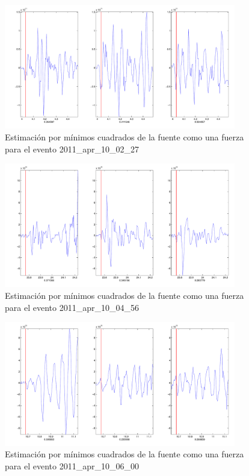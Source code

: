\begin{figure}[H]
\includegraphics[width=0.9\textwidth,height=0.4\textheight]{linea_timerev/figuras/plotSrcEv25src.pdf}
\caption{Estimación por mínimos cuadrados de la fuente como una fuerza para el
evento 2011\_apr\_10\_02\_27}
\end{figure}
\begin{figure}[H]
\includegraphics[width=0.9\textwidth,height=0.4\textheight]{linea_timerev/figuras/plotSrcEv26src.pdf}
\caption{Estimación por mínimos cuadrados de la fuente como una fuerza para el
evento 2011\_apr\_10\_04\_56}
\end{figure}
\begin{figure}[H]
\includegraphics[width=0.9\textwidth,height=0.4\textheight]{linea_timerev/figuras/plotSrcEv27src.pdf}
\caption{Estimación por mínimos cuadrados de la fuente como una fuerza para el
evento 2011\_apr\_10\_06\_00}
\end{figure}
